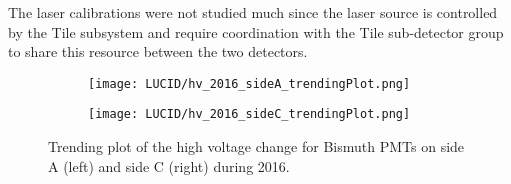 % 

The laser calibrations were not studied much since the laser source is controlled by the Tile subsystem and require 
coordination with the Tile sub-detector group to share this resource between the two detectors.

\begin{figure}
\centering
\begin{subfigure}{.5\textwidth}
  \centering
  \texttt{[image: LUCID/hv\_2016\_sideA\_trendingPlot.png]}
  \label{fig:sub3}
\end{subfigure}%
\begin{subfigure}{.5\textwidth}
  \centering
  \texttt{[image: LUCID/hv\_2016\_sideC\_trendingPlot.png]}
  \label{fig:sub4}
\end{subfigure}
\caption{Trending plot of the high voltage change for Bismuth PMTs on side A (left) and side C (right) during 2016.}
\label{fig:hv_trending_plot_2016}
\end{figure}





